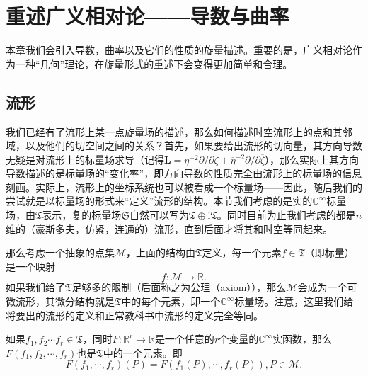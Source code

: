 \chapter{重述广义相对论——导数与曲率}

本章我们会引入导数，曲率以及它们的性质的旋量描述。重要的是，广义相对论作为一种“几何”理论，在旋量形式的重述下会变得更加简单和合理。


\section{流形}

我们已经有了流形上某一点旋量场的描述，那么如何描述时空流形上的点和其邻域，以及他们的切空间之间的关系？首先，如果要给出流形的切向量，其方向导数无疑是对流形上的标量场求导（记得$\boldsymbol{L} =\eta ^{-2} \partial /\partial \zeta +\overline{\eta }^{-2} \partial /\partial \overline{\zeta }$），那么实际上其方向导数描述的是标量场的“变化率”，即方向导数的性质完全由流形上的标量场的信息刻画。实际上，流形上的坐标系统也可以被看成一个标量场——因此，随后我们的尝试就是以标量场的形式来“定义”流形的结构。本节我们考虑的是实的$\mathbb{C}^{\infty }$标量场，由$\mathfrak{T}$表示，复的标量场$\mathfrak{S}$自然可以写为$\mathfrak{T} \oplus \mathrm{i}\mathfrak{T}$。同时目前为止我们考虑的都是$n$维的（豪斯多夫，仿紧，连通的）流形，直到后面才将其和时空等同起来。



那么考虑一个抽象的点集$\mathcal{M}$，上面的结构由$\mathfrak{T}$定义，每一个元素$f\in \mathfrak{T}$（即标量）是一个映射
\begin{equation*}
	f:\mathcal{M}\rightarrow \mathbb{R} .
\end{equation*}
如果我们给了$\mathfrak{T}$足够多的限制（后面称之为公理（axiom）），那么$\mathcal{M}$会成为一个可微流形，其微分结构就是$\mathfrak{T}$中的每个元素，即一个$\mathbb{C}^{\infty }$标量场。注意，这里我们给将要出的流形的定义和正常教科书中流形的定义完全等同。

\begin{post}[label={postulate 5.1}]{}
	如果$f_{1} ,f_{2} \cdots f_{r} \in \mathfrak{T}$，同时$F:\mathbb{R}^{r}\rightarrow \mathbb{R}$是一个任意的$r$个变量的$\mathbb{C}^{\infty }$实函数，那么$F( f_{1} ,f_{2} ,\cdots ,f_{r})$也是$\mathfrak{T}$中的一个元素。即
	\begin{equation*}
		F( f_{1} ,\cdots ,f_{r})( P) =F( f_{1}( P) ,\cdots ,f_{r}( P)) ,P\in \mathcal{M} .
	\end{equation*}
\end{post}

